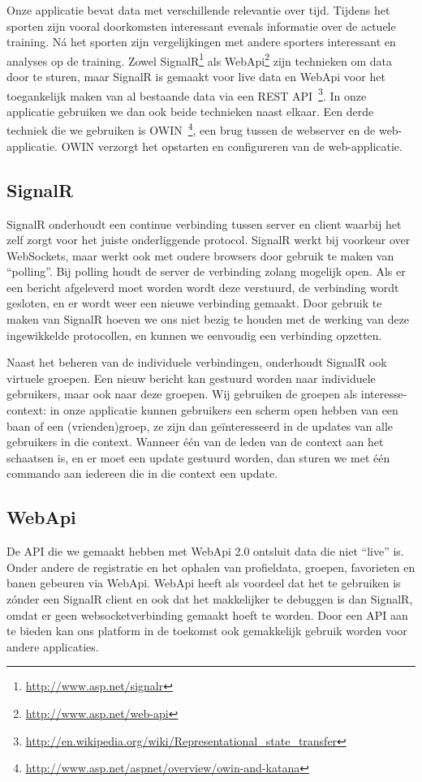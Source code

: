 Onze applicatie bevat data met verschillende relevantie over tijd. Tijdens het sporten zijn vooral doorkomsten interessant evenals informatie over de actuele training. Ná het sporten zijn vergelijkingen met andere sporters interessant en analyses op de training. Zowel SignalR\footnote{\url{http://www.asp.net/signalr}} als WebApi\footnote{\url{http://www.asp.net/web-api}} zijn technieken om data door te sturen, maar SignalR is gemaakt voor live data en WebApi voor het toegankelijk maken van al bestaande data via een REST API~\footnote{\url{http://en.wikipedia.org/wiki/Representational_state_transfer}}. In onze applicatie gebruiken we dan ook beide technieken naast elkaar. Een derde techniek die we gebruiken is OWIN~\footnote{\url{http://www.asp.net/aspnet/overview/owin-and-katana}}, een brug tussen de webserver en de web-applicatie. OWIN verzorgt het opstarten en configureren van de web-applicatie.

\subsection{SignalR}
SignalR onderhoudt een continue verbinding tussen server en client waarbij het zelf zorgt voor het juiste onderliggende protocol. SignalR werkt bij voorkeur over WebSockets, maar werkt ook met oudere browsers door gebruik te maken van ``polling''. Bij polling houdt de server de verbinding zolang mogelijk open. Als er een bericht afgeleverd moet worden wordt deze verstuurd, de verbinding wordt gesloten, en er wordt weer een nieuwe verbinding gemaakt. Door gebruik te maken van SignalR hoeven we ons niet bezig te houden met de werking van deze ingewikkelde protocollen, en kunnen we eenvoudig een verbinding opzetten.

Naast het beheren van de individuele verbindingen, onderhoudt SignalR ook virtuele groepen. Een nieuw bericht kan gestuurd worden naar individuele gebruikers, maar ook naar deze groepen. Wij gebruiken de groepen als interesse-context: in onze applicatie kunnen gebruikers een scherm open hebben van een baan of een (vrienden)groep, ze zijn dan geïnteresseerd in de updates van alle gebruikers in die context. Wanneer één van de leden van de context aan het schaatsen is, en er moet een update gestuurd worden, dan sturen we met één commando aan iedereen die in die context een update.

\subsection{WebApi}
De API die we gemaakt hebben met WebApi 2.0 ontsluit data die niet ``live'' is. Onder andere de registratie en het ophalen van profieldata, groepen, favorieten en banen gebeuren via WebApi. WebApi heeft als voordeel dat het te gebruiken is zónder een SignalR client en ook dat het makkelijker te debuggen is dan SignalR, omdat er geen  websocketverbinding gemaakt hoeft te worden. Door een API aan te bieden kan ons platform in de toekomst ook gemakkelijk gebruik worden voor andere applicaties.

